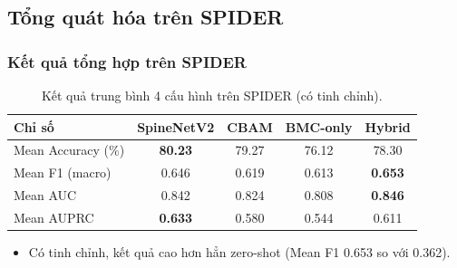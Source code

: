 \documentclass{beamer}
\numberwithin{figure}{section}
\numberwithin{table}{section}
\begin{document}
\subsection{Tổng quát hóa trên SPIDER}
\begin{frame}
\frametitle{Kết quả tổng hợp trên SPIDER}
\begin{table}
\centering
\small
\begin{tabular}{lcccc}
\toprule
\textbf{Chỉ số} & \textbf{SpineNetV2} & \textbf{CBAM} & \textbf{BMC-only} & \textbf{Hybrid} \\
\midrule
Mean Accuracy (\%) & \textbf{80.23} & 79.27 & 76.12 & 78.30 \\
Mean F1 (macro)    & 0.646 & 0.619 & 0.613 & \textbf{0.653} \\
Mean AUC           & 0.842 & 0.824 & 0.808 & \textbf{0.846} \\
Mean AUPRC         & \textbf{0.633} & 0.580 & 0.544 & 0.611 \\
\bottomrule
\end{tabular}
\caption{Kết quả trung bình 4 cấu hình trên SPIDER (có tinh chỉnh).}
\end{table}
\begin{itemize}
    \item[$\rightarrow$] Có tinh chỉnh, kết quả cao hơn hẳn zero-shot (Mean F1 0.653 so với 0.362).
\end{itemize}
\end{frame}
\end{document}
